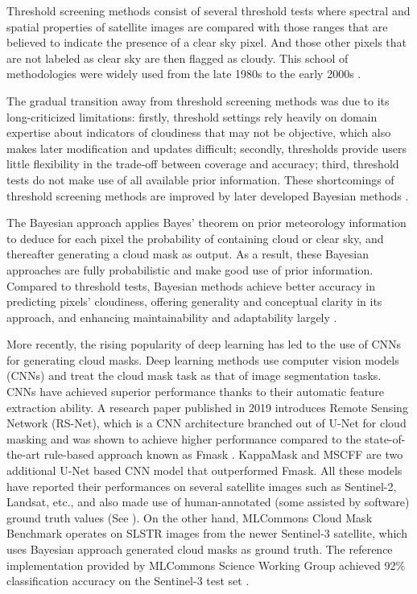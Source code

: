 \documentclass[sigplan,screen]{acmart}
\begin{document}
Threshold screening methods consist of several threshold tests where spectral and spatial properties of satellite images are compared with those ranges that are believed to indicate the presence of a clear sky pixel. And those other pixels that are not labeled as clear sky are then flagged as cloudy. This school of methodologies were widely used from the late 1980s to the early 2000s \cite{Merchant2005ProbabilisticPB}. 

The gradual transition away from threshold screening methods was due to its long-criticized limitations: firstly, threshold settings rely heavily on domain expertise about indicators of cloudiness that may not be objective, which also makes later modification and updates difficult; secondly, thresholds provide users little flexibility in the trade-off between coverage and accuracy; third, threshold tests do not make use of all available prior information. These shortcomings of threshold screening methods are improved by later developed Bayesian methods \cite{Merchant2005ProbabilisticPB}.

The Bayesian approach applies Bayes' theorem on prior meteorology information to deduce for each pixel the probability of containing cloud or clear sky, and thereafter generating a cloud mask as output. As a result, these Bayesian approaches are fully probabilistic and make good use of prior information. Compared to threshold tests, Bayesian methods achieve better accuracy in predicting pixels' cloudiness, offering generality and conceptual clarity in its approach, and enhancing maintainability and adaptability largely \cite{Merchant2005ProbabilisticPB}. 

More recently, the rising popularity of deep learning has led to the use of CNNs for generating cloud masks. Deep learning methods \cite{Li2019DeepLB,Domnich2021KappaMaskAC,Yan2018CloudAC,WIELAND2019111203,JEPPESEN2019247} use computer vision models (CNNs) and treat the cloud mask task as that of image segmentation tasks. CNNs have achieved superior performance thanks to their automatic feature extraction ability. A research paper published in 2019 \cite{JEPPESEN2019247} introduces Remote Sensing Network (RS-Net), which is a CNN architecture branched out of U-Net \cite{Ronneberger2015UNetCN} for cloud masking and was shown to achieve higher performance compared to the state-of-the-art rule-based approach known as Fmask \cite{Zhu2012ObjectbasedCA}. KappaMask \cite{Domnich2021KappaMaskAC} and MSCFF \cite{Li2019DeepLB} are two additional U-Net based CNN model that outperformed Fmask. All these models have reported their performances on several satellite images such as Sentinel-2, Landsat, etc., and also made use of human-annotated (some assisted by software) ground truth values (See ). On the other hand, MLCommons Cloud Mask Benchmark operates on SLSTR images from the newer Sentinel-3 satellite, which uses Bayesian approach generated cloud masks as ground truth. The reference implementation provided by MLCommons Science Working Group achieved 92\% classification accuracy on the Sentinel-3 test set \cite{Thiyagalingam2022AIBF}.
\end{document}
